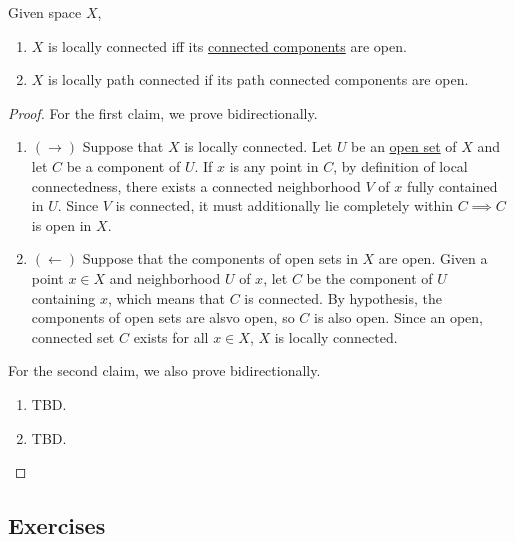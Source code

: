   \begin{theorem}
    \label{thm:open-components-and-local-path-connectedness}
    Given space $X$, 
    \begin{enumerate}
      \item $X$ is locally connected iff its \hyperref[def:connected-components]{connected components} are open. 
      \item $X$ is locally path connected if its path connected components are open. 
    \end{enumerate}
  \end{theorem}
  \begin{proof}
    For the first claim, we prove bidirectionally. 
    \begin{enumerate}
      \item $(\rightarrow)$ Suppose that $X$ is locally connected. Let $U$ be an \hyperref[def:open-set]{open set} of $X$ and let $C$ be a component of $U$. If $x$ is any point in $C$, by definition of local connectedness, there exists a connected neighborhood $V$ of $x$ fully contained in $U$. Since $V$ is connected, it must additionally lie completely within $C \implies C$ is open in $X$. 
      \item $(\leftarrow)$ Suppose that the components of open sets in $X$ are open. Given a point $x \in X$ and neighborhood $U$ of $x$, let $C$ be the component of $U$ containing $x$, which means that $C$ is connected. By hypothesis, the components of open sets are alsvo open, so $C$ is also open. Since an open, connected set $C$ exists for all $x \in X$, $X$ is locally connected. 
    \end{enumerate}
    For the second claim, we also prove bidirectionally. 
    \begin{enumerate}
      \item TBD. 
      \item TBD. 
    \end{enumerate}
  \end{proof}

\subsection{Exercises}


